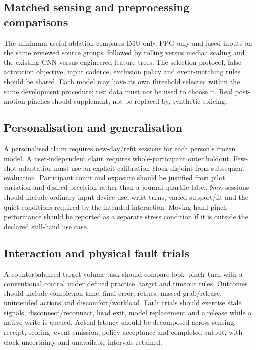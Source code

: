 \subsection{Matched sensing and preprocessing comparisons}\label{matched-sensing-and-preprocessing-comparisons}

The minimum useful ablation compares IMU-only, PPG-only and fused inputs on the same reviewed source groups, followed by rolling versus median scaling and the existing CNN versus engineered-feature trees. The selection protocol, false-activation objective, input cadence, exclusion policy and event-matching rules should be shared. Each model may have its own threshold selected within the same development procedure; test data must not be used to choose it. Real post-motion pinches should supplement, not be replaced by, synthetic splicing.

\subsection{Personalisation and generalisation}\label{personalisation-and-generalisation}

A personalised claim requires new-day/refit sessions for each person's frozen model. A user-independent claim requires whole-participant outer holdout. Few-shot adaptation must use an explicit calibration block disjoint from subsequent evaluation. Participant count and exposure should be justified from pilot variation and desired precision rather than a journal-quartile label. New sessions should include ordinary input-device use, wrist turns, varied support/fit and the quiet conditions required by the intended interaction. Moving-hand pinch performance should be reported as a separate stress condition if it is outside the declared still-hand use case.

\subsection{Interaction and physical fault trials}\label{interaction-and-physical-fault-trials}

A counterbalanced target-volume task should compare look--pinch--turn with a conventional control under defined practice, target and timeout rules. Outcomes should include completion time, final error, retries, missed grab/release, unintended actions and discomfort/workload. Fault trials should exercise stale signals, disconnect/reconnect, head exit, model replacement and a release while a native write is queued. Actual latency should be decomposed across sensing, receipt, scoring, event emission, policy acceptance and completed output, with clock uncertainty and unavailable intervals retained.

